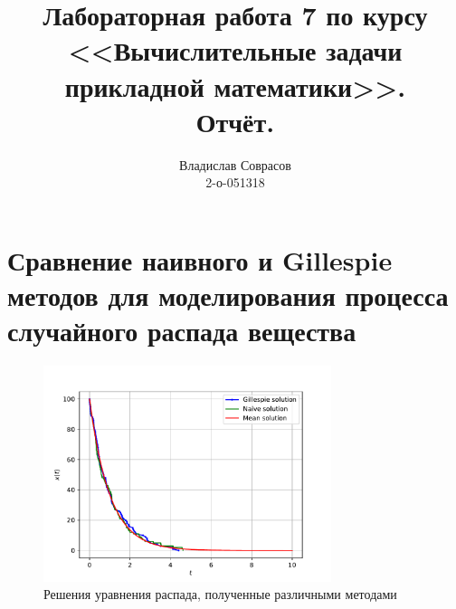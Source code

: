 \documentclass[a4paper]{article}
\begin{document}
\title{Лабораторная работа 7 по курсу <<Вычислительные задачи прикладной математики>>. \\Отчёт.}
\author{Владислав Соврасов\\ 2-о-051318}
\date{}
\maketitle

\section{Сравнение наивного и Gillespie методов для моделирования процесса случайного распада вещества}


\begin{figure}[H]
	\center
	\includegraphics[width=0.75\textwidth]{../pictures/lab7_eq_1.pdf}
	\caption{Решения уравнения распада, полученные различными методами}
	\label{fig:1d_decay}
\end{figure}
\end{document}
